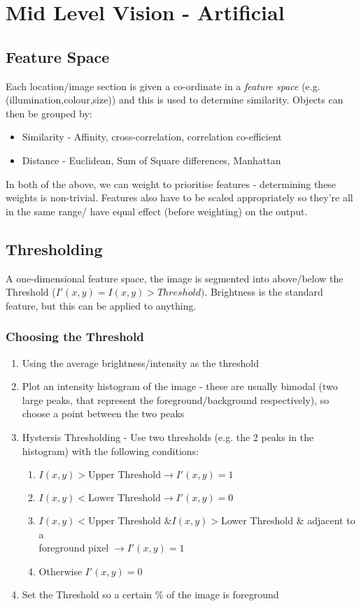 \section{Mid Level Vision - Artificial}

\subsection{Feature Space}
Each location/image section is given a co-ordinate in a \emph{feature space} (e.g. (illumination,colour,size)) and this is used to determine similarity. Objects can then be grouped by:
\begin{itemize}
    \item Similarity - Affinity, cross-correlation, correlation co-efficient
    \item Distance - Euclidean, Sum of Square differences, Manhattan
\end{itemize}
In both of the above, we can weight to prioritise features - determining these weights is non-trivial. Features also have to be scaled appropriately so they're all in the same range/ have equal effect (before weighting) on the output.

\subsection{Thresholding}
A one-dimensional feature space, the image is segmented into above/below the Threshold ($I'(x,y) = I(x,y) > Threshold)$. Brightness is the standard feature, but this can be applied to anything.  

\subsubsection{Choosing the Threshold}
\begin{enumerate}
    \item Using the average brightness/intensity as the threshold
    \item Plot an intensity histogram of the image - these are usually bimodal (two large peaks, that represent the foreground/background respectively), so choose a point between the two peaks
    \item Hystersis Thresholding - Use two thresholds (e.g. the 2 peaks in the histogram) with the following conditions:
    \begin{enumerate}
        \item $I(x,y)> \text{Upper Threshold} \rightarrow I'(x,y) = 1$
        \item $I(x,y)< \text{Lower Threshold} \rightarrow I'(x,y) = 0$
        \item $I(x,y)< \text{Upper Threshold } \& I(x,y) > $Lower Threshold \& adjacent to a\\ foreground pixel $\rightarrow I'(x,y) = 1$
        \item Otherwise $I'(x,y) = 0$
    \end{enumerate}
    \item Set the Threshold so a certain \% of the image is foreground
\end{enumerate}


